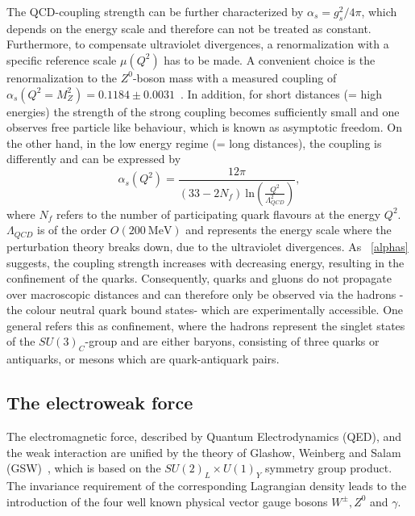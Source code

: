\noindent The QCD-coupling strength can be further characterized by  $\alpha_s = g_s^2/4\pi$, which depends  on the energy scale and therefore can not be treated as constant. Furthermore, to compensate ultraviolet divergences, a renormalization with a specific reference scale $\mu(Q^2)$ has to be made. A convenient choice is the renormalization to the $Z^0$-boson mass with a measured coupling of $\alpha_s(Q^2=M_Z^2) = 0.1184 \pm 0.0031$~\cite{Bethke:2000ai}. In addition, for short distances (= high energies) the strength of the strong coupling becomes sufficiently small and one observes free particle like behaviour, which is known as asymptotic freedom. On the other hand, in the low energy regime (= long distances), the coupling is differently and can be expressed by 
\begin{equation}\label{alphas}
\alpha_s(Q^2)=\frac{12\pi}{(33-2N_f)~\text{ln}(\frac{Q^2}{\Lambda_{QCD}^2})},
\end{equation}
where $N_f$ refers to the number of participating quark flavours at the energy $Q^2$. $\Lambda_{QCD}$ is of the order $O(200~\text{MeV})$ and represents the energy scale where the perturbation theory  breaks down, due to the ultraviolet divergences. As ~\cref{alphas} suggests, the coupling strength increases with decreasing energy, resulting in the confinement of the quarks. Consequently, quarks and gluons do not propagate over macroscopic distances and can therefore only be observed via the hadrons -the colour neutral quark bound states- which are experimentally accessible. One general refers this as confinement, where the hadrons represent the singlet states of  the $SU(3)_C$-group and are either baryons, consisting of three quarks or antiquarks,  or mesons which are quark-antiquark pairs. 
























\subsection{The electroweak force}\label{EW}
The electromagnetic force, described by Quantum Electrodynamics (QED), and the weak interaction are unified by the theory of Glashow, Weinberg and Salam (GSW)~\cite{Glashow:1961tr,Weinberg:1967tq,Salam:1964ry}, which is based on the $SU(2)_L\times U(1)_Y$ symmetry group product. The invariance requirement of the corresponding Lagrangian density leads to the introduction of the four well known physical vector gauge bosons $W^{\pm}, Z^0$ and $\gamma$.

